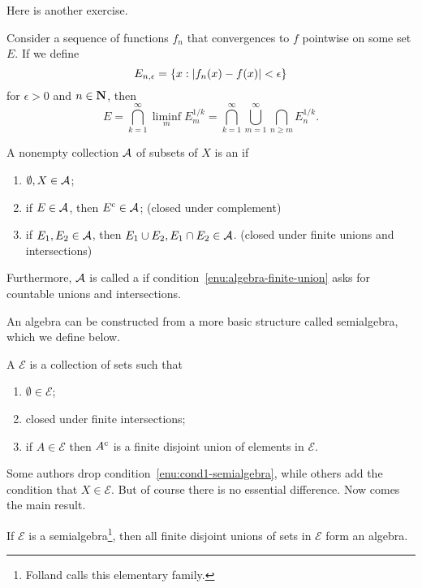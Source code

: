 Here is another exercise.

\begin{xca}
    Consider a sequence of functions $f_n$ that convergences to $f$ pointwise on some set $E$. If we define \[
        E_{n,\epsilon} = \{x:\lvert f_n(x) - f(x) \rvert < \epsilon\}
    \] for $\epsilon > 0$ and $n\in \mathbf{N}$, then \[
        E = \bigcap_{k=1}^\infty \liminf_m E_m^{1/k} = \bigcap_{k=1}^\infty \bigcup_{m=1}^\infty \bigcap_{n\geq m} E_n^{1/k}.
    \]
\end{xca}

\begin{defn}
    A nonempty collection $\mathcal{A}$ of subsets of $X$ is an  if \begin{enumerate}
        \item $\emptyset,X \in \mathcal{A}$;
        \item if $E \in \mathcal{A}$, then $E^{\mathrm{c}} \in \mathcal{A}$; (closed under complement)
        \item \label{enu:algebra-finite-union} if $E_1,E_2\in \mathcal{A}$, then $E_1 \cup E_2, E_1\cap E_2 \in \mathcal{A}$. (closed under finite unions and intersections)
    \end{enumerate}
    Furthermore, $\mathcal{A}$ is called a  if condition~\ref{enu:algebra-finite-union} asks for countable unions and intersections.
\end{defn}

An algebra can be constructed from a more basic structure called semialgebra, which we define below.
\begin{defn}
    A  $\mathcal{E}$ is a collection of sets such that \begin{enumerate}
        \item \label{enu:cond1-semialgebra}$\emptyset \in \mathcal{E}$;
        \item closed under finite intersections;
        \item if $A \in \mathcal{E}$ then $A^{\mathrm{c}}$ is a finite disjoint union of elements in $\mathcal{E}$.
    \end{enumerate}
\end{defn}
Some authors drop condition~\ref{enu:cond1-semialgebra}, while others add the condition that $X \in \mathcal{E}$. But of course there is no essential difference. Now comes the main result.

\begin{prop} \label{prop:semialgebra-to-algebra}
    If $\mathcal{E}$ is a semialgebra\footnote{Folland calls this elementary family.}, then all finite disjoint unions of sets in $\mathcal{E}$ form an algebra.
\end{prop}

